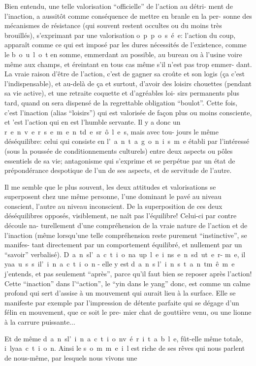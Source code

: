 Bien entendu, une telle valorisation ``officielle'' de l'action au détri-
ment de l'inaction, a aussitôt comme conséquence de mettre en branle en la per-
sonne des mécanismes de résistance (qui souvent restent occultes ou du moins
très brouillés), s'exprimant par une valorisation \mbox{o p p o s é e}: l'action\inserted{,} du
coup, apparaît comme ce qui est imposé par les dures nécessités de l'existence,
comme le \mbox{b o u l o t} en somme, emmerdant au possible, au bureau ou à l'usine
voire même aux champs, et éreintant en tous cas même s'il n'est pas trop emmer-
dant. La vraie raison d'être de l'action, c'est de gagner sa croûte et son logis
(ça c'est l'indispensable), et au-delà de ça et surtout, d'avoir des loisirs
chouettes (pendant sa vie active), et une retraite coquette et d'agréables loi-
sirs permanents plus tard, quand on sera dispensé de la regrettable obligation
``boulot''. Cette fois, c'est l'inaction (alias ``loisirs'') qui est valorisée de
façon plus ou moins consciente, et 'est l'action qui en est l'humble servante.
Il y a donc un \mbox{r e n v e r s e m e n t\quad d e s\quad r ô l e s}, mais avec tou-
jours le même déséquilibre: celui qui consiste en \mbox{l' a n t a g o n i s m e}
établi par l'intéressé (sous la poussée de conditionnements culturels) entre
deux aspects ou pôles essentiels de sa vie; antagonisme qui s'exprime et se
perpétue par un état de prépondérance despotique de l'un de ses aspects, et de
servitude de l'autre.

Il me semble que le plus souvent, les deux attitudes et valorisations se
superposent chez une même personne, l'une dominant le pavé au niveau conscient,
l'autre au niveau inconscient. De la superposition de ces deux déséquilibres
opposés, visiblement, ne naît pas l'équilibre! Celui-ci par contre découle na-
turellement d'une compréhension de la vraie nature de l'action et de l'inaction
(même lorsqu'une telle compréhension reste purement ``instinctive'', se manifes-
tant directement par un comportement équilibré, et nullement par un ``savoir''
verbalisé). \mbox{D a n s\quad l' a c t i o n\quad a u\quad p l e i n\quad s e n s\quad d u\quad t e r-}
\mbox{m e}, il \mbox{y\quad a\quad a u s s i\quad l' i n a c t i o n} - elle y est \mbox{d a n s}
\mbox{l' i n s t a n t\quad m ê m e} j'entends, et pas seulement ``après'', parce qu'il
faut bien se reposer après l'action! Cette ``inaction'' dans l'``action'', le ``yin
dans le yang'' donc, est comme un calme profond qui sert d'assise à un mouvement
qui aurait lieu à la surface. Elle se manifeste par exemple par l'impression
de détente parfaite qui se dégage d'un félin en mouvement, que ce soit le pre-
mier chat de gouttière venu, ou une lionne à la carrure puissante...

Et de même \mbox{d a n s\quad l' i n a c t i o n\quad v é r i t a b l e}, fût-elle
même totale, \mbox{i l\quad y\quad a\quad a c t i o n}. Ainsi le \mbox{s o m m e i l} est riche
de ses rêves qui nous parlent de nous-même, par lesquels nous vivons une
